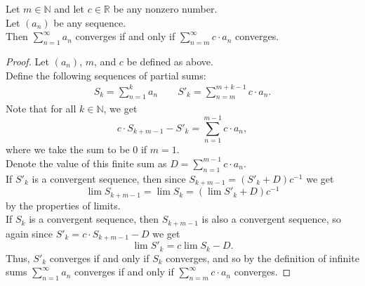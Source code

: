 \documentclass{article}
\newenvironment{theorem}[1]{\renewcommand\theinnercustomthm{#1}\innercustomthm}
  {\endinnercustomthm}
\begin{document}
\newpage{}
\begin{theorem}{5}
    Let $m \in \mathbb N$ and let $c \in \mathbb R$ be any nonzero number. \\
    Let $(a_n)$ be any sequence. \\
    Then $\sum\limits_{n=1}^\infty a_n$ converges if and only if $\sum\limits_{n=m}^\infty c \cdot a_n$ converges. 
\end{theorem}
\begin{proof}
    Let $(a_n)$, $m$, and $c$ be defined as above. \\
    Define the following sequences of partial sums:
    \begin{align*}
        S_k = \sum_{n=1}^k a_n \qquad S'_k =\sum_{n=m}^{m+k-1} c\cdot a_n.
    \end{align*}
    Note that for all $k\in \mathbb N$, we get
    \[
    c\cdot S_{k+m-1} - S'_k = \sum_{n=1}^{m-1} c\cdot a_n,
    \]
    where we take the sum to be $0$ if $m = 1$. \\
    Denote the value of this finite sum as $D = \sum\limits_{n=1}^{m-1} c\cdot a_n$. \\
    If $S'_k$ is a convergent sequence, then since $S_{k+m-1}= (S'_k + D)c^{-1}$ we get \[\lim S_{k+m-1} = \lim S_k = (\lim S'_k+ D)c^{-1}\] by the properties of limits. \\
    If $S_k$ is a convergent sequence, then $S_{k+m-1}$ is also a convergent sequence, so again since $S'_k = c\cdot S_{k+m-1}-D$ we get \[\lim S'_k = c\lim S_k-D.\]
    Thus, $S'_k$ converges if and only if $S_k$ converges, and so by the definition of infinite sums $\sum\limits_{n=1}^\infty a_n$ converges if and only if $\sum\limits_{n=m}^\infty c \cdot a_n$ converges.
\end{proof}
\end{document}
